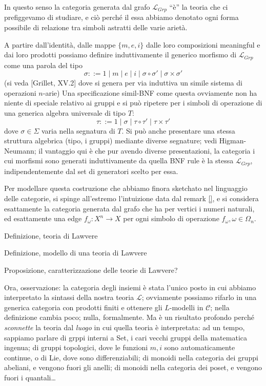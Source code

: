 \documentclass[a4paper, 11pt]{article}
\begin{document}
In questo senso la categoria generata dal grafo $\mathcal{L}_{Grp}$ ``è'' la teoria che ci prefiggevamo di studiare, e ciò perché il essa abbiamo denotato ogni forma possibile di relazione tra simboli astratti delle varie arietà.

A partire dall'identità, dalle mappe $\{m,e,i\}$ dalle loro composizioni meaningful e dai loro prodotti possiamo definire induttivamente il generico morfismo di $\mathcal{L}_{Grp}$ come una parola del tipo
\[\sigma ::= 1 \mid m \mid e \mid i \mid \sigma \circ \sigma' \mid \sigma\times \sigma'\]
(si veda [Grillet, XV.2] dove si genera per via induttiva un simile sistema di operazioni $n$-arie) Una specificazione simil-BNF come questa ovviamente non ha niente di speciale relativo ai gruppi e si può ripetere per i simboli di operazione di una generica algebra universale di tipo $T$:
\[\tau ::= 1 \mid \sigma \mid \tau \circ \tau' \mid \tau\times \tau'\]
dove $\sigma\in\Sigma$ varia nella segnatura di $T$. Si può anche presentare una stessa struttura algebrica (tipo, i gruppi) mediante diverse segnature; vedi Higman-Neumann; il vantaggio qui è che pur avendo diverse presentazioni, la categoria i cui morfismi sono generati induttivamente da quella BNF rule è la stessa $\mathcal{L}_{Grp}$, indipendentemente dal set di generatori scelto per essa.

Per modellare questa costruzione che abbiamo finora sketchato nel linguaggio delle categorie, si spinge all'estremo l'intuizione data dal remark \ref{}, e si considera esattamente la categoria generata dal grafo che ha per vertici i numeri naturali, ed esattamente una edge $f_\omega : X^n \to X$ per ogni simbolo di operazione $f_\omega, \omega \in\Omega_n$.

Definizione, teoria di Lawvere

Definizione, modello di una teoria di Lawvere 

Proposizione, caratterizzazione delle teorie di Lawvere? 

Ora, osservazione: la categoria degli insiemi è stata l'unico posto in cui abbiamo interpretato la sintassi della nostra teoria $\mathcal L$; ovviamente possiamo rifarlo in una generica categoria con prodotti finiti e ottenere gli $L$-modelli in $\mathcal C$; nella definizione cambia poco; nulla, formalmente. Ma è un risultato profondo perché \emph{sconnette} la teoria dal \emph{luogo} in cui quella teoria è interpretata: ad un tempo, sappiamo parlare di grppi interni a Set, i cari vecchi gruppi della matematica ingenua; di gruppi topologici, dove le funzioni $m,i$ sono automaticamente continue, o di Lie, dove sono differenziabili; di monoidi nella categoria dei gruppi abeliani, e vengono fuori gli anelli; di monoidi nella categoria dei poset, e vengono fuori i quantali\dots 
\end{document}
